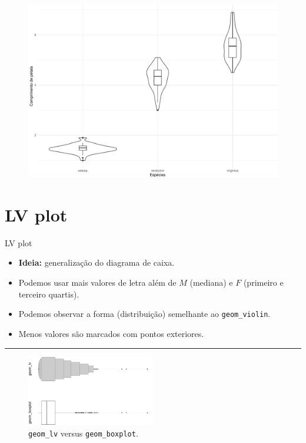 \documentclass[
  10pt,
  ignorenonframetext,
]{beamer}
\providecommand{\tightlist}{%
  \setlength{\itemsep}{0pt}\setlength{\parskip}{0pt}}\usepackage{longtable,booktabs,array}
\newcommand*{\regrafina}{\rule{\textwidth}{0.5pt}}
\begin{document}
\begin{frame}
\begin{figure}

{\centering \includegraphics[width=1\textwidth,height=\textheight]{exploracao-visualizacao_files/figure-beamer/unnamed-chunk-114-1.pdf}

}

\end{figure}
\end{frame}

\hypertarget{lv-plot}{%
\section{LV plot}\label{lv-plot}}

\begin{frame}[fragile]{LV plot}
\protect\hypertarget{lv-plot-1}{}
\begin{itemize}
\tightlist
\item
  \textbf{Ideia:} generalização do diagrama de caixa.
\item
  Podemos usar mais valores de letra além de \(M\) (mediana) e \(F\)
  (primeiro e terceiro quartis).
\item
  Podemos observar a forma (distribuição) semelhante ao
  \texttt{geom\_violin}.
\item
  Menos valores são marcados com pontos exteriores.
\end{itemize}

\regrafina

\begin{figure}

{\centering \includegraphics[width=0.5\textwidth,height=\textheight]{exploracao-visualizacao_files/figure-beamer/unnamed-chunk-115-1.pdf}

}

\caption{\texttt{geom\_lv} versus \texttt{geom\_boxplot}.}

\end{figure}
\end{frame}
\end{document}
